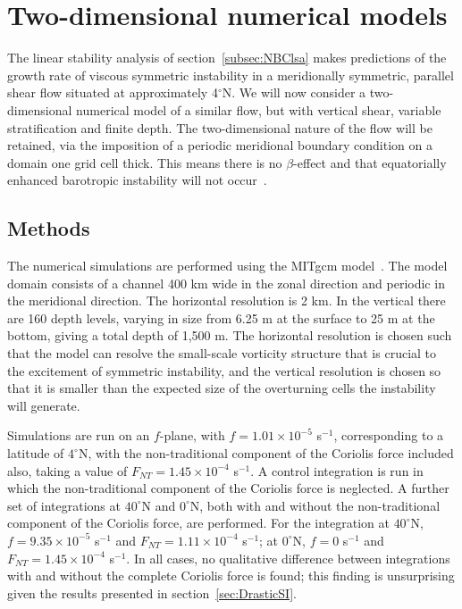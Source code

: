 \section{Two-dimensional numerical models}
The linear stability analysis of section~\ref{subsec:NBClsa} makes predictions of the growth rate of viscous symmetric instability in a meridionally symmetric, parallel shear flow situated at approximately 4$^\circ$N. We will now consider a two-dimensional numerical model of a similar flow, but with vertical shear, variable stratification and finite depth. The two-dimensional nature of the flow will be retained, via the imposition of a periodic meridional boundary condition on a domain one grid cell thick. This means there is no $\beta$-effect and that equatorially enhanced barotropic instability will not occur~\citep{Edwards1998I, Edwards1998II}.

\subsection{Methods}
\label{subsec:2DMethods}
The numerical simulations are performed using the MITgcm model~\citep{Marshall1997}. The model domain consists of a channel 400 km wide in the zonal direction and periodic in the meridional direction. The horizontal resolution is 2 km. In the vertical there are 160 depth levels, varying in size from 6.25 m at the surface to 25 m at the bottom, giving a total depth of 1,500 m. The horizontal resolution is chosen such that the model can resolve the small-scale vorticity structure that is crucial to the excitement of symmetric instability, and the vertical resolution is chosen so that it is smaller than the expected size of the overturning cells the instability will generate.

Simulations are run on an $f$-plane, with $f = 1.01 \times 10 ^{-5}$ s$^{-1}$, corresponding to a latitude of $4^\circ$N, with the non-traditional component of the Coriolis force included also, taking a value of $F_{NT} = 1.45 \times 10^{-4}$ s$^{-1}$. A control integration is run in which the non-traditional component of the Coriolis force is neglected. A further set of integrations at $40^\circ$N and $0^\circ$N, both with and without the non-traditional component of the Coriolis force, are performed. For the integration at $40^\circ$N, $f = 9.35 \times 10^{-5} $ s$^{-1}$ and $F_{NT} = 1.11 \times 10^{-4}$ s$^{-1}$; at $0^\circ$N, $f = 0$ s$^{-1}$ and $F_{NT} = 1.45 \times 10^{-4}$ s$^{-1}$. In all cases, no qualitative difference between integrations with and without the complete Coriolis force is found; this finding is unsurprising given the results presented in section~\ref{sec:DrasticSI}.

